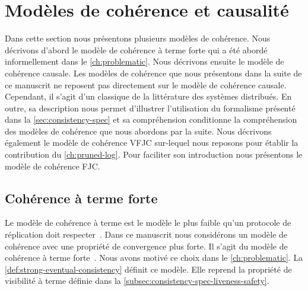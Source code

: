 \section{Modèles de cohérence et causalité}\label{sec:causal-models}

Dans cette section nous présentons plusieurs modèles de cohérence.
Nous décrivons d'abord le modèle de cohérence à terme forte qui a été abordé informellement dans le \autoref{ch:problematic}.
Nous décrivons ensuite le modèle de cohérence causale.
Les modèles de cohérence que nous présentons dans la suite de ce manuscrit ne reposent pas directement sur le modèle de cohérence causale.
Cependant, il s'agit d'un classique de la littérature des systèmes distribués.
En outre, sa description nous permet d'illustrer l'utilisation du formalisme présenté dans la \autoref{sec:consistency-spec} et sa compréhension conditionne la compréhension des modèles de cohérence que nous abordons par la suite.
Nous décrivons également le modèle de cohérence \acf{VFJC} sur-lequel nous reposons pour établir la contribution du \autoref{ch:pruned-log}.
Pour faciliter son introduction nous présentons le modèle de cohérence \acf{FJC}.

\subsection{Cohérence à terme forte}\label{subsec:strong-eventual-consistency}

Le modèle de cohérence à terme est le modèle le plus faible qu'un protocole de réplication doit respecter~\autocite{saito_2005_optimisticreplication,burckhardt_eventualconsistency_2014}.
Dans ce manuscrit nous considérons un modèle de cohérence avec une propriété de convergence plus forte.
Il s'agit du modèle de cohérence à terme forte~\autocite{shapiro_2011_crdt,burckhardt_eventualconsistency_2014}.
Nous avons motivé ce choix dans le \autoref{ch:problematic}.
La \autoref{def:strong-eventual-consistency} définit ce modèle.
Elle reprend la propriété de visibilité à terme définie dans la \autoref{subsec:consistency-spec-liveness-safety}.

